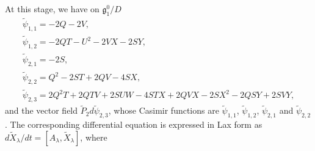 \documentclass[pdftex]{sigma}
\numberwithin{equation}{section}
\begin{document}
At this stage, we have on $\mathfrak{g}^0_1/D$
\begin{gather*}
\widetilde{\psi}_{1,1} = -2Q - 2V, \\
\widetilde{\psi}_{1,2} = -2QT - U^2 - 2VX - 2SY, \\
\widetilde{\psi}_{2,1} = -2S, \\
\widetilde{\psi}_{2,2} = Q^2 - 2ST + 2QV- 4SX, \\
\widetilde{\psi}_{2,3} = 2Q^2T + 2QTV + 2SUW - 4STX+ 2QVX -2SX^2 - 2QSY + 2SVY,
\end{gather*}
and the vector f\/ield $\widetilde{P}_2d\widetilde{\psi}_{2,3}$, whose Casimir functions are $\widetilde{\psi}_{1,1}$, $\widetilde{\psi}_{1,2}$, $\widetilde{\psi}_{2,1}$ and $\widetilde{\psi}_{2,2}$. The corresponding dif\/ferential equation is expressed in Lax form as $d\widetilde{X}_\lambda /dt = [A_\lambda , \widetilde{X}_\lambda ]$, where
\end{document}
